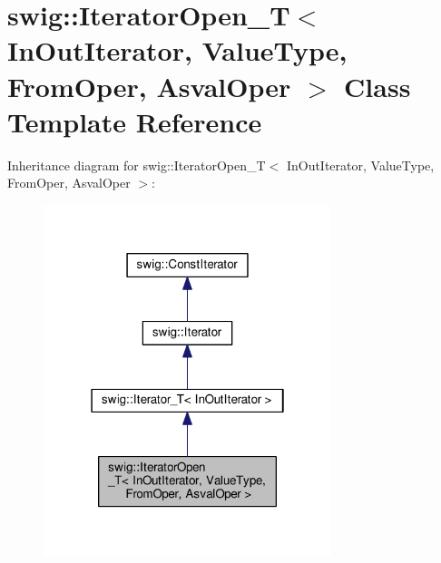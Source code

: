 \hypertarget{classswig_1_1IteratorOpen__T}{}\section{swig\+:\+:Iterator\+Open\+\_\+T$<$ In\+Out\+Iterator, Value\+Type, From\+Oper, Asval\+Oper $>$ Class Template Reference}
\label{classswig_1_1IteratorOpen__T}


Inheritance diagram for swig\+:\+:Iterator\+Open\+\_\+T$<$ In\+Out\+Iterator, Value\+Type, From\+Oper, Asval\+Oper $>$\+:
\nopagebreak
\begin{figure}[H]
\begin{center}
\leavevmode
\includegraphics[width=238pt]{classswig_1_1IteratorOpen__T__inherit__graph}
\end{center}
\end{figure}


